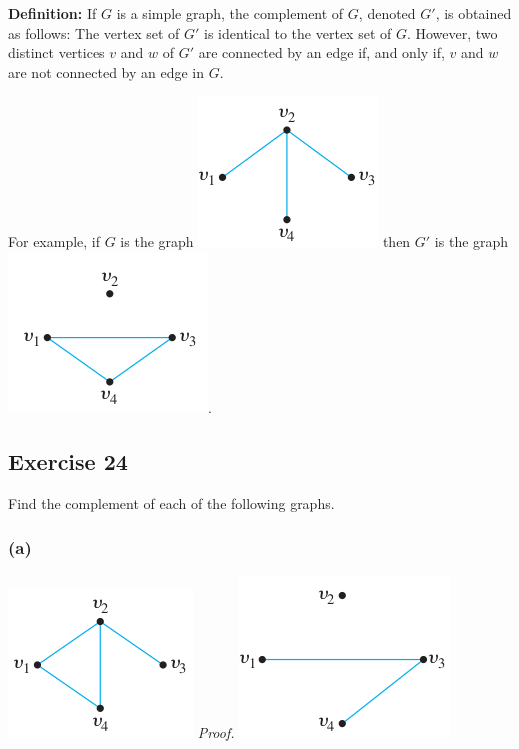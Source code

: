 \documentclass[14pt]{extarticle}
\newcommand{\cy}{\color{cyan}}
\begin{document}
\begin{tcolorbox}[colframe=cyan]
    {\bf \cy Definition:} If \(G\) is a simple graph, the complement of \(G\), denoted \(G'\), is obtained as follows:
    The vertex set of \(G'\) is identical to the vertex set of \(G\). However, two distinct vertices \(v\) and \(w\) of \(G'\)
    are connected by an edge if, and only if, \(v\) and \(w\) are not connected by an edge in \(G\).

    For example, if \(G\) is the graph \includegraphics[scale=0.4]{../images/10.1.24.1.png} then \(G'\) is the graph
    \includegraphics[scale=0.4]{../images/10.1.24.2.png}.
\end{tcolorbox}

\subsection{Exercise 24}
Find the complement of each of the following graphs.

\subsubsection{(a)}
\includegraphics[scale=0.5]{../images/10.1.24.a.1.png}
{\it Proof.}
\includegraphics[scale=0.5]{../images/10.1.24.a.2.png}
\end{document}

